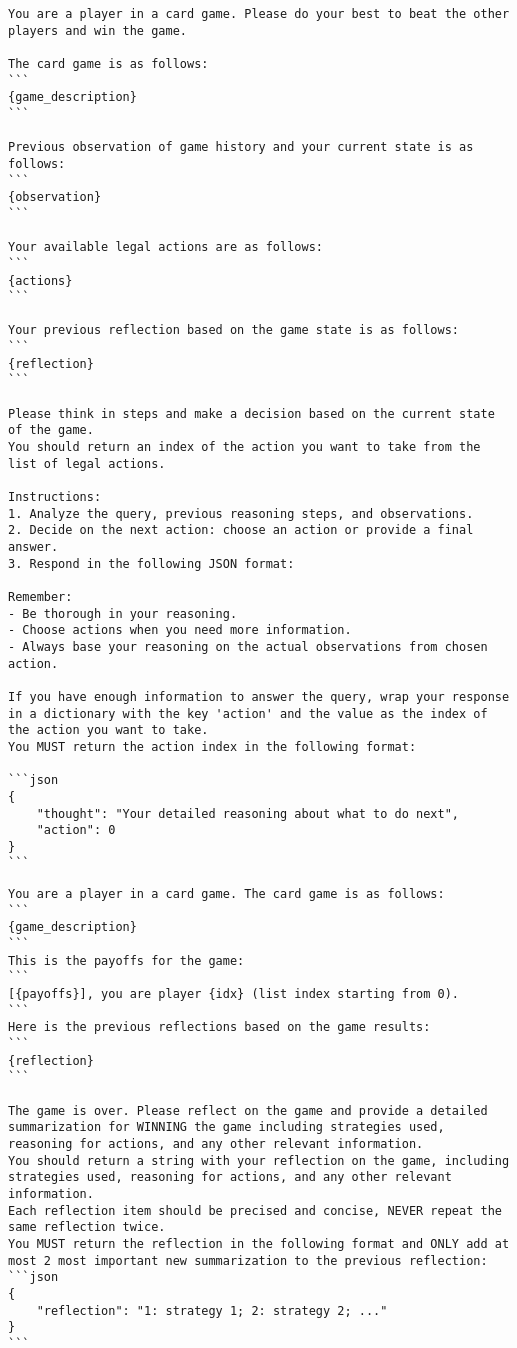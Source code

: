 \begin{tcolorbox}[
breakable,
title=Game-play Prompt for Reflexion Agent,  
colframe=promptcolor, 
colback=white,
]
\begin{lstlisting}[]
You are a player in a card game. Please do your best to beat the other players and win the game.

The card game is as follows:
```
{game_description}
```

Previous observation of game history and your current state is as follows:
```
{observation}
```

Your available legal actions are as follows:
```
{actions}
```

Your previous reflection based on the game state is as follows:
```
{reflection}
```

Please think in steps and make a decision based on the current state of the game.
You should return an index of the action you want to take from the list of legal actions.

Instructions:
1. Analyze the query, previous reasoning steps, and observations.
2. Decide on the next action: choose an action or provide a final answer.
3. Respond in the following JSON format:

Remember:
- Be thorough in your reasoning.
- Choose actions when you need more information.
- Always base your reasoning on the actual observations from chosen action.

If you have enough information to answer the query, wrap your response in a dictionary with the key 'action' and the value as the index of the action you want to take.
You MUST return the action index in the following format:

```json
{
    "thought": "Your detailed reasoning about what to do next",
    "action": 0
}
```
\end{lstlisting}
\end{tcolorbox}


\begin{tcolorbox}[
breakable,
title=Long-term Reflection Prompt for Reflexion Agent,  
colframe=promptcolor, 
colback=white,
]
\begin{lstlisting}[]
You are a player in a card game. The card game is as follows:
```
{game_description}
```
This is the payoffs for the game:
```
[{payoffs}], you are player {idx} (list index starting from 0).
```
Here is the previous reflections based on the game results:
```
{reflection}
```

The game is over. Please reflect on the game and provide a detailed summarization for WINNING the game including strategies used, reasoning for actions, and any other relevant information.
You should return a string with your reflection on the game, including strategies used, reasoning for actions, and any other relevant information.
Each reflection item should be precised and concise, NEVER repeat the same reflection twice.
You MUST return the reflection in the following format and ONLY add at most 2 most important new summarization to the previous reflection:
```json
{
    "reflection": "1: strategy 1; 2: strategy 2; ..."
}
```
\end{lstlisting}
\end{tcolorbox}


